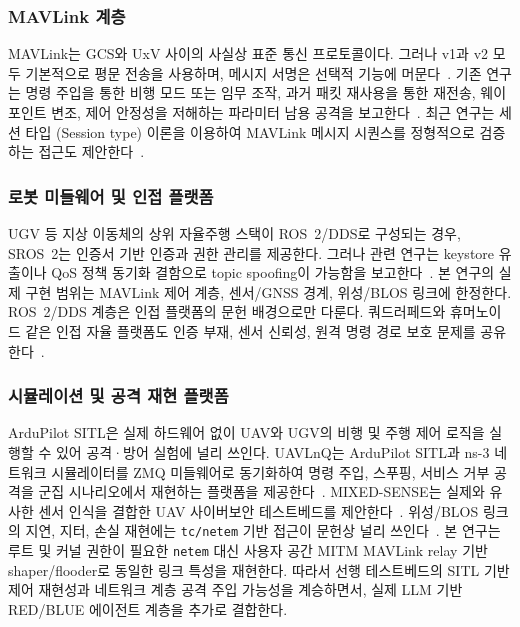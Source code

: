 \subsubsection{MAVLink 계층}

MAVLink는 GCS와 UxV 사이의 사실상 표준 통신 프로토콜이다. 그러나 v1과 v2 모두 기본적으로 평문 전송을 사용하며, 메시지 서명은 선택적 기능에 머문다~\cite{uas_survey_sok,mavlink_nutshell}. 기존 연구는 명령 주입을 통한 비행 모드 또는 임무 조작, 과거 패킷 재사용을 통한 재전송, 웨이포인트 변조, 제어 안정성을 저해하는 파라미터 남용 공격을 보고한다~\cite{ficco2022mavlink,mavshield,ardupilot_reverse,muvids,mavlink_survey_threats,mavlink_vuln_sciup}. 최근 연구는 세션 타입 (Session type) 이론을 이용하여 MAVLink 메시지 시퀀스를 정형적으로 검증하는 접근도 제안한다~\cite{session_types_mavlink}.

\subsubsection{로봇 미들웨어 및 인접 플랫폼}

UGV 등 지상 이동체의 상위 자율주행 스택이 ROS~2/DDS로 구성되는 경우, SROS~2는 인증서 기반 인증과 권한 관리를 제공한다. 그러나 관련 연구는 keystore 유출이나 QoS 정책 동기화 결함으로 topic spoofing이 가능함을 보고한다~\cite{ros2_supply_chain,sros2_insecurity,ros2_threat_model,ros2_lidar_spoofing}. 본 연구의 실제 구현 범위는 MAVLink 제어 계층, 센서/GNSS 경계, 위성/BLOS 링크에 한정한다. ROS~2/DDS 계층은 인접 플랫폼의 문헌 배경으로만 다룬다. 쿼드러페드와 휴머노이드 같은 인접 자율 플랫폼도 인증 부재, 센서 신뢰성, 원격 명령 경로 보호 문제를 공유한다~\cite{quadruped_survey,humanoid_sok}.

\subsubsection{시뮬레이션 및 공격 재현 플랫폼}

ArduPilot SITL은 실제 하드웨어 없이 UAV와 UGV의 비행 및 주행 제어 로직을 실행할 수 있어 공격·방어 실험에 널리 쓰인다. UAVLnQ는 ArduPilot SITL과 ns-3 네트워크 시뮬레이터를 ZMQ 미들웨어로 동기화하여 명령 주입, 스푸핑, 서비스 거부 공격을 군집 시나리오에서 재현하는 플랫폼을 제공한다~\cite{uavlnq}. MIXED-SENSE는 실제와 유사한 센서 인식을 결합한 UAV 사이버보안 테스트베드를 제안한다~\cite{mixed_sense}. 위성/BLOS 링크의 지연, 지터, 손실 재현에는 \texttt{tc/netem} 기반 접근이 문헌상 널리 쓰인다~\cite{theaterq}. 본 연구는 루트 및 커널 권한이 필요한 \texttt{netem} 대신 사용자 공간 MITM MAVLink relay 기반 shaper/flooder로 동일한 링크 특성을 재현한다. 따라서 선행 테스트베드의 SITL 기반 제어 재현성과 네트워크 계층 공격 주입 가능성을 계승하면서, 실제 LLM 기반 RED/BLUE 에이전트 계층을 추가로 결합한다.

